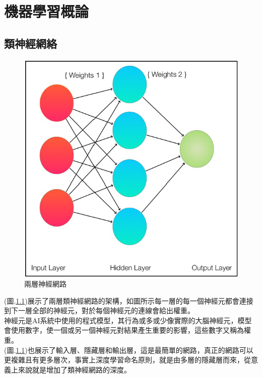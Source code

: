 \documentclass[14pt,a4paper]{report}  %
\begin{document}
\renewcommand{\baselinestretch}{0.5} %
\chapter{機器學習概論}
\section{類神經網絡}
\begin{figure}[hbt!]
\begin{center}
\includegraphics[scale=0.74]{兩層神經網路}
\caption{\Large 兩層神經網路}\label{兩層神經網路}
\end{center}
\end{figure}

 (圖.\ref{兩層神經網路})展示了兩層類神經網路的架構，如圖所示每一層的每一個神經元都會連接到下一層全部的神經元，對於每個神經元的連線會給出權重。\\

 神經元是AI系統中使用的程式模型，其行為或多或少像實際的大腦神經元，模型會使用數字，使一個或另一個神經元對結果產生重要的影響，這些數字又稱為權重。\\

 (圖.\ref{兩層神經網路})也展示了輸入層、隱藏層和輸出層，這是最簡單的網路，真正的網路可以更複雜且有更多層次，事實上深度學習命名原則，就是由多層的隱藏層而來，從意義上來說就是增加了類神經網路的深度。\\
\end{document}
